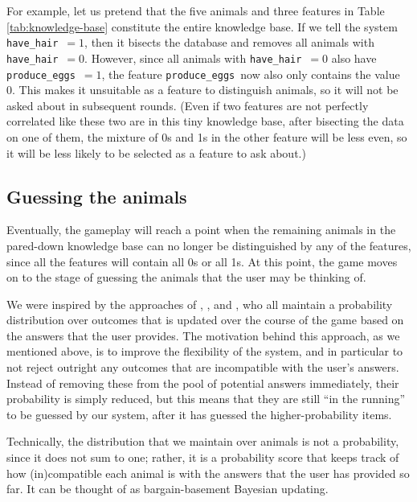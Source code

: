 \documentclass[11pt,a4paper]{article}
\newcommand{\havehair}{\texttt{have\_hair}}
\newcommand{\produceeggs}{\texttt{produce\_eggs}}
\begin{document}
For example, let us pretend that the five animals and three features in Table \ref{tab:knowledge-base} constitute the entire knowledge base.
If we tell the system \havehair\ $= 1$, then it bisects the database and removes all animals with \havehair\ $= 0$.
However, since all animals with \havehair\ $= 0$ also have \produceeggs\ $= 1$, the feature \produceeggs\ now also only contains the value 0.
This makes it unsuitable as a feature to distinguish animals, so it will not be asked about in subsequent rounds.
(Even if two features are not perfectly correlated like these two are in this tiny knowledge base, after bisecting the data on one of them, the mixture of 0s and 1s in the other feature will be less even, so it will be less likely to be selected as a feature to ask about.)

\subsection{Guessing the animals}
\label{subsec:guess-animals}

Eventually, the gameplay will reach a point when the remaining animals in the pared-down knowledge base can no longer be distinguished by any of the features, since all the features will contain all 0s or all 1s.
At this point, the game moves on to the stage of guessing the animals that the user may be thinking of.

We were inspired by the approaches of \citet{DeyEa2019}, \citet{HuEa2018}, and \citet{Burgener2006}, who all maintain a probability distribution over outcomes that is updated over the course of the game based on the answers that the user provides.
The motivation behind this approach, as we mentioned above, is to improve the flexibility of the system, and in particular to not reject outright any outcomes that are incompatible with the user's answers.
Instead of removing these from the pool of potential answers immediately, their probability is simply reduced, but this means that they are still ``in the running'' to be guessed by our system, after it has guessed the higher-probability items.

Technically, the distribution that we maintain over animals is not a probability, since it does not sum to one; rather, it is a probability score that keeps track of how (in)compatible each animal is with the answers that the user has provided so far.
It can be thought of as bargain-basement Bayesian updating.
\end{document}

